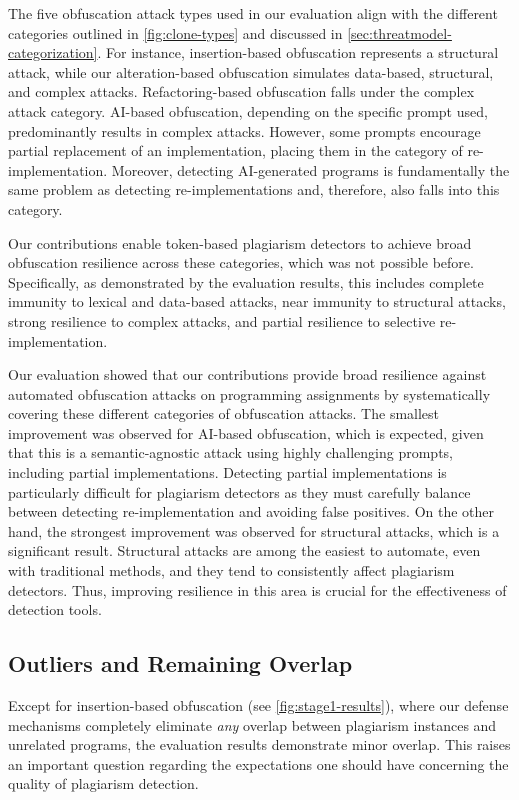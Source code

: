 The five obfuscation attack types used in our evaluation align with the different categories outlined in \autoref{fig:clone-types} and discussed in \autoref{sec:threatmodel-categorization}.
For instance, insertion-based obfuscation represents a structural attack, while our alteration-based obfuscation simulates data-based, structural, and complex attacks. Refactoring-based obfuscation falls under the complex attack category. AI-based obfuscation, depending on the specific prompt used, predominantly results in complex attacks. However, some prompts encourage partial replacement of an implementation, placing them in the category of re-implementation. Moreover, detecting AI-generated programs is fundamentally the same problem as detecting re-implementations and, therefore, also falls into this category.

Our contributions enable token-based plagiarism detectors to achieve broad obfuscation resilience across these categories, which was not possible before.
Specifically, as demonstrated by the evaluation results, this includes complete immunity to lexical and data-based attacks, near immunity to structural attacks, strong resilience to complex attacks, and partial resilience to selective re-implementation.

Our evaluation showed that our contributions provide broad resilience against automated obfuscation attacks on programming assignments by systematically covering these different categories of obfuscation attacks. The smallest improvement was observed for AI-based obfuscation, which is expected, given that this is a semantic-agnostic attack using highly challenging prompts, including partial implementations. Detecting partial implementations is particularly difficult for plagiarism detectors as they must carefully balance between detecting re-implementation and avoiding false positives.
On the other hand, the strongest improvement was observed for structural attacks, which is a significant result. Structural attacks are among the easiest to automate, even with traditional methods, and they tend to consistently affect plagiarism detectors. Thus, improving resilience in this area is crucial for the effectiveness of detection tools.


\subsection{Outliers and Remaining Overlap}

Except for insertion-based obfuscation (see \autoref{fig:stage1-results}), where our defense mechanisms completely eliminate \textit{any} overlap between plagiarism instances and unrelated programs, the evaluation results demonstrate minor overlap. This raises an important question regarding the expectations one should have concerning the quality of plagiarism detection.


